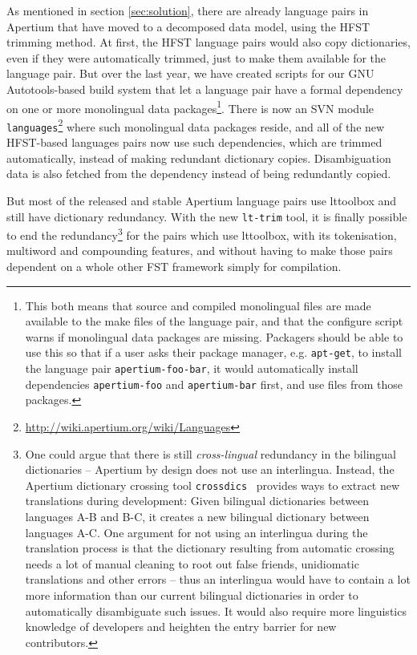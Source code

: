 \documentclass[10pt, a4paper]{article}
\newcommand{\tool}[1]{\texttt{#1}}
\begin{document}
As mentioned in section \ref{sec:solution}, there are already language
pairs in Apertium that have moved to a decomposed data model, using
the HFST trimming method. At first, the HFST language
pairs would also copy dictionaries, even if they were automatically
trimmed, just to make them available for the language pair.  But over
the last year, we have created scripts for our GNU Autotools-based
build system that let a language pair have a formal dependency on one
or more monolingual data packages\footnote{This both means that source
    and compiled monolingual files are made available to the make
    files of the language pair, and that the configure script warns if
    monolingual data packages are missing. Packagers should be able to
    use this so 
    that if a user asks their package manager, e.g. \tool{apt-get}, to
    install the language pair \tool{apertium-foo-bar}, it would
automatically install dependencies \tool{apertium-foo} and
\tool{apertium-bar} first, and use files from those packages.}.  There
is now an SVN module
\texttt{languages}\footnote{\href{http://wiki.apertium.org/wiki/Languages}{http://wiki.apertium.org/wiki/Languages}}
where such monolingual data packages reside, and all of the new
HFST-based languages pairs now use such dependencies, which are
trimmed automatically, instead of making redundant dictionary copies.
Disambiguation data is also fetched from the dependency instead of
being redundantly copied.

But most of the released and stable Apertium language pairs use
lttoolbox and still have dictionary redundancy. With the new
\tool{lt-trim} tool, it is finally possible to end the
redundancy\footnote{One could argue that there is still
  \emph{cross-lingual} redundancy in the bilingual dictionaries --
  Apertium by design does not use an interlingua. Instead, the
  Apertium dictionary crossing tool
  \tool{crossdics}~\cite{toral2011crossdics-it-ca} provides ways to
  extract new translations during development: Given bilingual
  dictionaries between languages A-B and B-C, it creates a new
  bilingual dictionary between languages A-C. One argument for not
  using an interlingua during the translation process is that the
  dictionary resulting from automatic crossing needs a lot of manual
  cleaning to root out false friends, unidiomatic translations and
  other errors -- thus an interlingua would have to contain a lot more
  information than our current bilingual dictionaries in order to
  automatically disambiguate such issues. It would also require more
  linguistics knowledge of developers and heighten the entry barrier
  for new contributors.} for the pairs which use lttoolbox, with its
tokenisation, multiword and compounding features, and without having
to make those pairs dependent on a whole other FST framework simply
for compilation.
\end{document}
